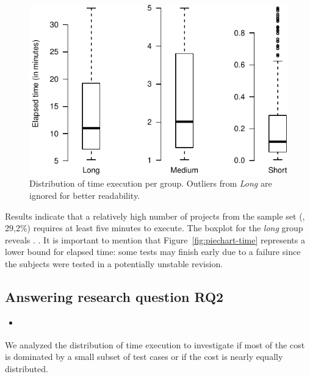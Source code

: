 \begin{figure}[h!]
    \centering
    \begin{minipage}{2.5in}%
    \includegraphics[width=\textwidth]{plots/boxplots-timecost.pdf}
    \end{minipage}%
    \caption{\label{fig:boxplots-time} Distribution of time execution
    per group. Outliers from \emph{Long} are ignored for better
    readability.}
\end{figure}

Results indicate that a relatively high number of projects from the
sample set (\ie, 29,2\%) requires at least five minutes to execute.
The boxplot for the \emph{long} group reveals . .  It is important to mention that
Figure~\ref{fig:piechart-time} represents a lower bound for elapsed
time: some tests may finish early due to a failure since the subjects
were tested in a potentially unstable revision.

\subsection{Answering research question RQ2}
\label{sec:rqB}

\begin{itemize}
    \item \emph{\RQB}
\end{itemize}

We analyzed the distribution of time execution to investigate if most
of the cost is dominated by a small subset of test cases or if the
cost is nearly equally distributed.  

